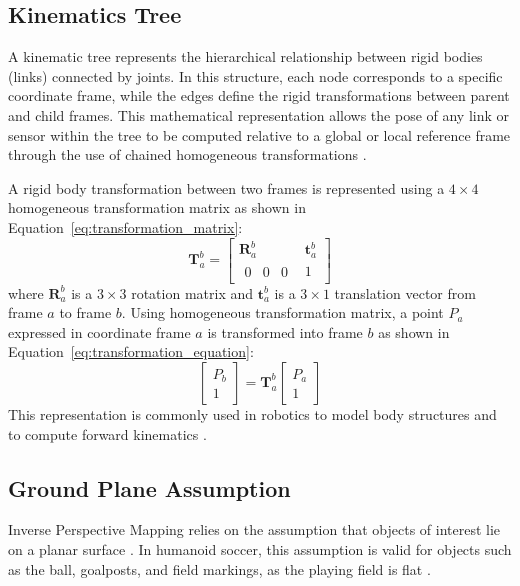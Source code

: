 \documentclass[journal]{IAENGtran}
\begin{document}
\subsection{Kinematics Tree}
A kinematic tree represents the hierarchical relationship between rigid
bodies (links) connected by joints. In this structure, each node corresponds
to a specific coordinate frame, while the edges define the rigid transformations
between parent and child frames. This mathematical representation allows the pose
of any link or sensor within the tree to be computed relative to a global or local
reference frame through the use of chained homogeneous transformations \cite{Craig2009,Siciliano2010}.

A rigid body transformation between two frames is represented using
a $4 \times 4$ homogeneous transformation matrix as shown in Equation~\ref{eq:transformation_matrix}:
\begin{equation} \label{eq:transformation_matrix}
\mathbf{T}_{a}^{b} =
\begin{bmatrix}
\mathbf{R}_{a}^{b} & \mathbf{t}_{a}^{b} \\
\begin{matrix} 0 & 0 & 0 \end{matrix} & 1
\end{bmatrix}
\end{equation}
where $\mathbf{R}_{a}^{b}$ is a $3 \times 3$ rotation matrix and
$\mathbf{t}_{a}^{b}$ is a $3 \times 1$ translation vector from frame
$a$ to frame $b$. Using homogeneous transformation matrix, a point $P_a$ expressed
in coordinate frame $a$ is transformed into frame $b$ as shown in
Equation~\ref{eq:transformation_equation}:
\begin{equation} \label{eq:transformation_equation}
\begin{bmatrix} P_b \\ 1 \end{bmatrix} = \mathbf{T}_{a}^{b} \begin{bmatrix} P_a \\ 1 \end{bmatrix}
\end{equation}
This representation is commonly used in robotics to model body structures and
to compute forward kinematics \cite{Kajita2014}.

\subsection{Ground Plane Assumption}
Inverse Perspective Mapping relies on the assumption that objects of interest lie on a planar surface \cite{Mark2024}.
In humanoid soccer, this assumption is valid for objects such as the ball, goalposts, and field markings,
as the playing field is flat \cite{RoboCupHumanoidLeague2025}.
\end{document}
